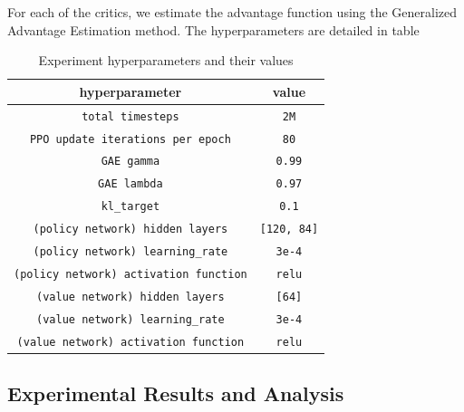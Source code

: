 For each of the critics, we estimate the advantage function using the Generalized Advantage Estimation method\cite{schulman2015highdimensional}.
The hyperparameters are detailed in table %

\begin{table}
  \begin{center}
    \begin{tabular}{cc}
      \hline 
      hyperparameter & value \\ 
      \hline 
      \verb!total timesteps! & \verb!2M! \\
      \verb!PPO update iterations per epoch! &  \verb!80! \\
      \verb!GAE gamma! & \verb!0.99! \\
      \verb!GAE lambda! & \verb!0.97! \\
      \verb!kl_target! & \verb!0.1! \\
      \verb!(policy network) hidden layers! & \verb![120, 84]! \\
      \verb!(policy network) learning_rate! & \verb!3e-4! \\
      \verb!(policy network) activation function! & \verb!relu!\\
      \verb!(value network) hidden layers! & \verb![64]! \\
      \verb!(value network) learning_rate! & \verb!3e-4! \\
      \verb!(value network) activation function! & \verb!relu! \\
      \hline      
    \end{tabular}
  \end{center}
  \caption{Experiment hyperparameters and their values}
  \label{hyperparameters}
\end{table}




 




\subsection{Experimental Results and Analysis}


